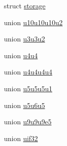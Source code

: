 \begin{DoxyCompactItemize}
struct \mbox{\hyperlink{structglm_1_1detail_1_1storage}{storage}}
\item 
union \mbox{\hyperlink{unionglm_1_1detail_1_1u10u10u10u2}{u10u10u10u2}}
\item 
union \mbox{\hyperlink{unionglm_1_1detail_1_1u3u3u2}{u3u3u2}}
\item 
union \mbox{\hyperlink{unionglm_1_1detail_1_1u4u4}{u4u4}}
\item 
union \mbox{\hyperlink{unionglm_1_1detail_1_1u4u4u4u4}{u4u4u4u4}}
\item 
union \mbox{\hyperlink{unionglm_1_1detail_1_1u5u5u5u1}{u5u5u5u1}}
\item 
union \mbox{\hyperlink{unionglm_1_1detail_1_1u5u6u5}{u5u6u5}}
\item 
union \mbox{\hyperlink{unionglm_1_1detail_1_1u9u9u9e5}{u9u9u9e5}}
\item 
union \mbox{\hyperlink{unionglm_1_1detail_1_1uif32}{uif32}}
\end{DoxyCompactItemize}
